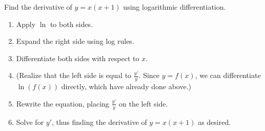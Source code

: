 \documentclass[12pt, a4paper]{article}
\begin{document}
\vspace{-1.0in}
\begin{ex}
	Find the derivative of $y = x(x+1)$ using logarithmic differentiation.
	\begin{enumerate}
		\item Apply $\ln$ to both sides.
		\bigskip
		\bigskip
		\item Expand the right side using log rules.
		\bigskip
		\bigskip
		\item Differentiate both sides with respect to $x$.
		\bigskip
		\bigskip
		\bigskip
		\bigskip
		\item (Realize that the left side is equal to $\frac{y'}{y}$.  Since $y = f(x)$, we can differentiate $\ln(f(x))$ directly, which have already done above.)
		\item Rewrite the equation, placing $\frac{y'}{y}$ on the left side.
		\bigskip
		\bigskip
		\item Solve for $y'$, thus finding the derivative of $y = x(x+1)$ as desired.
	\end{enumerate}
\end{ex}
\end{document}
